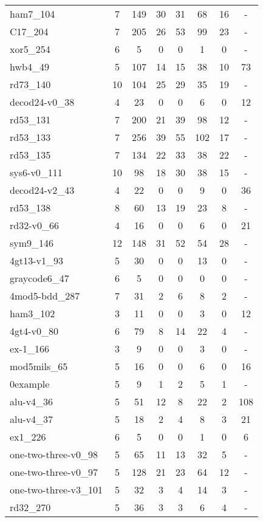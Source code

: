 \documentclass[journal]{IEEEtran}
\begin{document}
\begin{table*}[htbp]
\begin{center}
\begin{tabular}{|p{4.3cm}<{\centering}|c|c|c|c|c|c|c|}
				ham7\_104 & 7 & 149 & 30 & 31 & 68 & 16 & - \\ 
				C17\_204 & 7 & 205 & 26 & 53 & 99 & 23 & - \\ 
				xor5\_254 & 6 & 5 & 0 & 0 & 1 & 0 & - \\ 
				hwb4\_49 & 5 & 107 & 14 & 15 & 38 & 10 & 73 \\ 
				rd73\_140 & 10 & 104 & 25 & 29 & 35 & 19 & - \\ 
				decod24-v0\_38 & 4 & 23 & 0 & 0 & 6 & 0 & 12 \\ 
				rd53\_131 & 7 & 200 & 21 & 39 & 98 & 12 & - \\ 
				rd53\_133 & 7 & 256 & 39 & 55 & 102 & 17 & - \\ 
				rd53\_135 & 7 & 134 & 22 & 33 & 38 & 22 & - \\ 
				sys6-v0\_111 & 10 & 98 & 18 & 30 & 38 & 15 & - \\ 
				decod24-v2\_43 & 4 & 22 & 0 & 0 & 9 & 0 & 36 \\ 
				rd53\_138 & 8 & 60 & 13 & 19 & 23 & 8 & - \\ 
				rd32-v0\_66 & 4 & 16 & 0 & 0 & 6 & 0 & 21 \\ 
				sym9\_146 & 12 & 148 & 31 & 52 & 54 & 28 & - \\ 
				4gt13-v1\_93 & 5 & 30 & 0 & 0 & 13 & 0 & - \\ 
				graycode6\_47 & 6 & 5 & 0 & 0 & 0 & 0 & - \\ 
				4mod5-bdd\_287 & 7 & 31 & 2 & 6 & 8 & 2 & - \\ 
				ham3\_102 & 3 & 11 & 0 & 0 & 3 & 0 & 12 \\ 
				4gt4-v0\_80 & 6 & 79 & 8 & 14 & 22 & 4 & - \\ 
				ex-1\_166 & 3 & 9 & 0 & 0 & 3 & 0 & - \\ 
				mod5mils\_65 & 5 & 16 & 0 & 0 & 6 & 0 & 16 \\ 
				0example & 5 & 9 & 1 & 2 & 5 & 1 & - \\ 
				alu-v4\_36 & 5 & 51 & 12 & 8 & 22 & 2 & 108 \\ 
				alu-v4\_37 & 5 & 18 & 2 & 4 & 8 & 3 & 21 \\ 
				ex1\_226 & 6 & 5 & 0 & 0 & 1 & 0 & 6 \\ 
				one-two-three-v0\_98 & 5 & 65 & 11 & 13 & 32 & 5 & - \\ 
				one-two-three-v0\_97 & 5 & 128 & 21 & 23 & 64 & 12 & - \\ 
				one-two-three-v3\_101 & 5 & 32 & 3 & 4 & 14 & 3 & - \\ 
				rd32\_270 & 5 & 36 & 3 & 3 & 6 & 4 & - \\ 

\end{tabular}
\end{center}
\end{table*}
\end{document}
